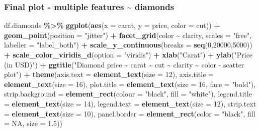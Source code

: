 \documentclass[
]{article}
\newenvironment{Shaded}{\begin{snugshade}}{\end{snugshade}}
\newcommand{\AttributeTok}[1]{\textcolor[rgb]{0.13,0.29,0.53}{#1}}
\newcommand{\ConstantTok}[1]{\textcolor[rgb]{0.56,0.35,0.01}{#1}}
\newcommand{\DecValTok}[1]{\textcolor[rgb]{0.00,0.00,0.81}{#1}}
\newcommand{\FloatTok}[1]{\textcolor[rgb]{0.00,0.00,0.81}{#1}}
\newcommand{\FunctionTok}[1]{\textcolor[rgb]{0.13,0.29,0.53}{\textbf{#1}}}
\newcommand{\NormalTok}[1]{#1}
\newcommand{\SpecialCharTok}[1]{\textcolor[rgb]{0.81,0.36,0.00}{\textbf{#1}}}
\newcommand{\StringTok}[1]{\textcolor[rgb]{0.31,0.60,0.02}{#1}}
\begin{document}
\subsubsection{Final plot - multiple features \textasciitilde{}
diamonds}\label{final-plot---multiple-features-diamonds}

\begin{Shaded}
\begin{Highlighting}[]
\NormalTok{df.diamonds }\SpecialCharTok{\%\textgreater{}\%} 
  \FunctionTok{ggplot}\NormalTok{(}\FunctionTok{aes}\NormalTok{(}\AttributeTok{x =}\NormalTok{ carat, }
             \AttributeTok{y =}\NormalTok{ price, }
             \AttributeTok{color =}\NormalTok{ cut)) }\SpecialCharTok{+}
  \FunctionTok{geom\_point}\NormalTok{(}\AttributeTok{position =} \StringTok{"jitter"}\NormalTok{) }\SpecialCharTok{+}
  \FunctionTok{facet\_grid}\NormalTok{(color }\SpecialCharTok{\textasciitilde{}}\NormalTok{ clarity, }
             \AttributeTok{scales =} \StringTok{"free"}\NormalTok{, }
             \AttributeTok{labeller =} \StringTok{"label\_both"}\NormalTok{) }\SpecialCharTok{+}
  \FunctionTok{scale\_y\_continuous}\NormalTok{(}\AttributeTok{breaks =} \FunctionTok{seq}\NormalTok{(}\DecValTok{0}\NormalTok{,}\DecValTok{20000}\NormalTok{,}\DecValTok{5000}\NormalTok{)) }\SpecialCharTok{+}
  \FunctionTok{scale\_color\_viridis\_d}\NormalTok{(}\AttributeTok{option =} \StringTok{"viridis"}\NormalTok{) }\SpecialCharTok{+}
  \FunctionTok{xlab}\NormalTok{(}\StringTok{"Carat"}\NormalTok{) }\SpecialCharTok{+}
  \FunctionTok{ylab}\NormalTok{(}\StringTok{"Price (in USD)"}\NormalTok{) }\SpecialCharTok{+}
  \FunctionTok{ggtitle}\NormalTok{(}\StringTok{"Diamond price \textasciitilde{} carat \textasciitilde{} cut \textasciitilde{} clarity \textasciitilde{} color {-} scatter plot"}\NormalTok{) }\SpecialCharTok{+}
  \FunctionTok{theme}\NormalTok{(}\AttributeTok{axis.text =} \FunctionTok{element\_text}\NormalTok{(}\AttributeTok{size =} \DecValTok{12}\NormalTok{),}
        \AttributeTok{axis.title =} \FunctionTok{element\_text}\NormalTok{(}\AttributeTok{size =} \DecValTok{16}\NormalTok{),}
        \AttributeTok{plot.title =} \FunctionTok{element\_text}\NormalTok{(}\AttributeTok{size =} \DecValTok{16}\NormalTok{, }\AttributeTok{face =} \StringTok{"bold"}\NormalTok{),}
        \AttributeTok{strip.background =} \FunctionTok{element\_rect}\NormalTok{(}\AttributeTok{colour =} \StringTok{"black"}\NormalTok{, }\AttributeTok{fill =} \StringTok{"white"}\NormalTok{),}
        \AttributeTok{legend.title =} \FunctionTok{element\_text}\NormalTok{(}\AttributeTok{size =} \DecValTok{14}\NormalTok{),}
        \AttributeTok{legend.text =} \FunctionTok{element\_text}\NormalTok{(}\AttributeTok{size =} \DecValTok{12}\NormalTok{),}
        \AttributeTok{strip.text =} \FunctionTok{element\_text}\NormalTok{(}\AttributeTok{size =} \DecValTok{10}\NormalTok{),}
        \AttributeTok{panel.border =} \FunctionTok{element\_rect}\NormalTok{(}\AttributeTok{color =} \StringTok{"black"}\NormalTok{, }\AttributeTok{fill =} \ConstantTok{NA}\NormalTok{, }\AttributeTok{size =} \FloatTok{1.5}\NormalTok{))}
\end{Highlighting}
\end{Shaded}
\end{document}
